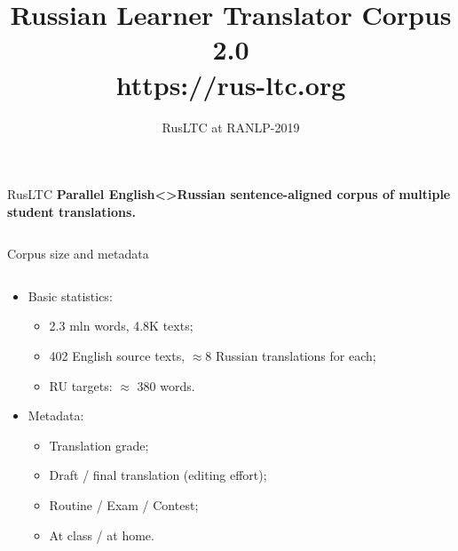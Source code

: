 \documentclass{beamer}
\author[Research Group in Computational Linguisstics, UK]{RusLTC at RANLP-2019}
\title{Russian Learner Translator Corpus 2.0 \\ https://rus-ltc.org}
\begin{document}
\begin{frame}[fragile]
\begin{block}{RusLTC} %
\large
\textbf{Parallel English<>Russian sentence-aligned corpus of multiple student translations.}
\end{block}
\vspace{-.5em}
\begin{columns}[T]
\begin{column}{.55\textwidth}

\begin{block}{Corpus size and metadata}
\begin{columns}
	\begin{column}{.5\linewidth}
		\begin{itemize}
			\item Basic statistics:
			\begin{itemize}
				\item \alert{2.3 mln words}, 4.8K texts;
				\item 402 English source texts, $\approx 8$ Russian translations for each;
				\item RU targets: $\approx$ 380 words.
			\end{itemize}
			\item Metadata:
			\begin{itemize}
				\item \alert{Translation grade}; %
				\item Draft / final translation (editing effort);
				\item Routine / \alert{Exam / Contest}; %
				\item At class / at home.
			\end{itemize}

		\end{itemize}
		
	\end{column}
	

\end{columns}
\end{block}
\end{column}
\end{columns}
\end{frame}
\end{document}
